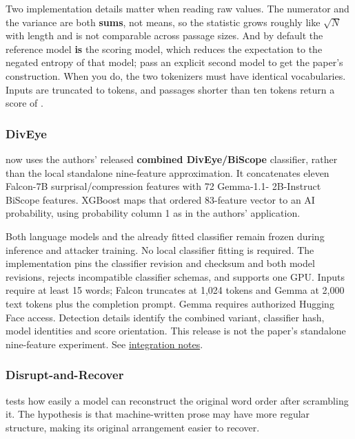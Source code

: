 Two implementation details matter when reading raw values. The numerator
and the variance are both \textbf{sums}, not means, so the statistic
grows roughly like \(\sqrt{N}\) with length and is not comparable across
passage sizes. And by default the reference model \textbf{is} the
scoring model, which reduces the expectation to the negated entropy of
that model; pass an explicit second model to get the paper's
construction. When you do, the two tokenizers must have identical
vocabularies. Inputs are truncated to \texttt{} tokens,
and passages shorter than ten tokens return a score of
\texttt{}.

\subsubsection{DivEye}\label{record-DETECTORS-md-diveye}

\texttt{} now uses the authors' released
\textbf{combined DivEye/BiScope} classifier, rather than the local
standalone nine-feature approximation. It concatenates eleven Falcon-7B
surprisal/compression features with 72 Gemma-1.1- 2B-Instruct BiScope
features. XGBoost maps that ordered 83-feature vector to an AI
probability, using probability column 1 as in the authors' application.

Both language models and the already fitted classifier remain frozen
during inference and attacker training. No local classifier fitting is
required. The implementation pins the classifier revision and checksum
and both model revisions, rejects incompatible classifier schemas, and
supports one GPU. Inputs require at least 15 words; Falcon truncates at
1,024 tokens and Gemma at 2,000 text tokens plus the completion prompt.
Gemma requires authorized Hugging Face access. Detection details
identify the combined variant, classifier hash, model identities and
score orientation. This release is not the paper's standalone
nine-feature experiment. See
\href{records/docs/diveye_classifier.tex}{integration notes}.

\subsubsection{Disrupt-and-Recover}\label{record-DETECTORS-md-disrupt-and-recover}

\texttt{} tests how easily a model can
reconstruct the original word order after scrambling it. The hypothesis
is that machine-written prose may have more regular structure, making
its original arrangement easier to recover.

